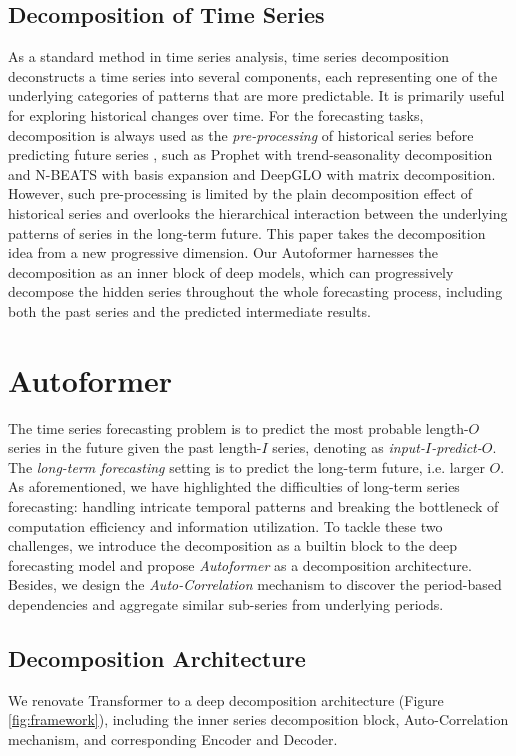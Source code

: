 \subsection{Decomposition of Time Series}
As a standard method in time series analysis, time series decomposition \cite{Anderson1976TimeSeries2E,Cleveland1990STLAS} deconstructs a time series into several components, each representing one of the underlying categories of patterns that are more predictable. It is primarily useful for exploring historical changes over time. For the forecasting tasks, decomposition is always used as the \emph{pre-processing} of historical series before predicting future series \cite{Hyndman2013ForecastingPA,Asadi2020ASD}, such as Prophet \cite{Taylor2017ForecastingAS} with trend-seasonality decomposition and N-BEATS \cite{oreshkin2019n} with basis expansion and DeepGLO \cite{Sen2019ThinkGA} with matrix decomposition. However, such pre-processing is limited by the plain decomposition effect of historical series and overlooks the hierarchical interaction between the underlying patterns of series in the long-term future. This paper takes the decomposition idea from a new progressive dimension. Our Autoformer harnesses the decomposition as an inner block of deep models, which can progressively decompose the hidden series throughout the whole forecasting process, including both the past series and the predicted intermediate results.

\section{Autoformer}

The time series forecasting problem is to predict the most probable length-$O$ series in the future given the past length-$I$ series, denoting as \textit{input-$I$-predict-$O$}. The \textit{long-term forecasting} setting is to predict the long-term future, i.e. larger $O$.
As aforementioned, we have highlighted the difficulties of long-term series forecasting: handling intricate temporal patterns and breaking the bottleneck of computation efficiency and information utilization. To tackle these two challenges, we introduce the decomposition as a builtin block to the deep forecasting model and propose \textit{Autoformer} as a decomposition architecture. Besides, we design the \textit{Auto-Correlation} mechanism to discover the period-based dependencies and aggregate similar sub-series from underlying periods.

\subsection{Decomposition Architecture}
We renovate Transformer \cite{NIPS2017_3f5ee243} to a deep decomposition architecture (Figure \ref{fig:framework}), including the inner series decomposition block, Auto-Correlation mechanism, and corresponding Encoder and Decoder.

